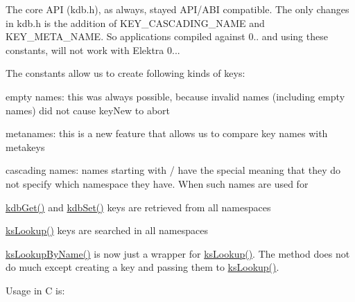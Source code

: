 The core A\+PI (kdb.\+h), as always, stayed A\+P\+I/\+A\+BI compatible. The only changes in kdb.\+h is the addition of {\ttfamily K\+E\+Y\+\_\+\+C\+A\+S\+C\+A\+D\+I\+N\+G\+\_\+\+N\+A\+ME} and {\ttfamily K\+E\+Y\+\_\+\+M\+E\+T\+A\+\_\+\+N\+A\+ME}. So applications compiled against 0.. and using these constants, will not work with Elektra 0...

The constants allow us to create following kinds of keys\+:


\begin{DoxyItemize}
\item empty names\+: this was always possible, because invalid names (including empty names) did not cause key\+New to abort
\item metanames\+: this is a new feature that allows us to compare key names with metakeys
\item cascading names\+: names starting with / have the special meaning that they do not specify which namespace they have. When such names are used for
\begin{DoxyItemize}
\item \mbox{\hyperlink{group__kdb_ga28e385fd9cb7ccfe0b2f1ed2f62453a1}{kdb\+Get()}} and \mbox{\hyperlink{group__kdb_ga11436b058408f83d303ca5e996832bcf}{kdb\+Set()}} keys are retrieved from all namespaces
\item \mbox{\hyperlink{group__keyset_gaa34fc43a081e6b01e4120daa6c112004}{ks\+Lookup()}} keys are searched in all namespaces
\item \mbox{\hyperlink{group__keyset_gad2e30fb6d4739d917c5abb2ac2f9c1a1}{ks\+Lookup\+By\+Name()}} is now just a wrapper for \mbox{\hyperlink{group__keyset_gaa34fc43a081e6b01e4120daa6c112004}{ks\+Lookup()}}. The method does not do much except creating a key and passing them to \mbox{\hyperlink{group__keyset_gaa34fc43a081e6b01e4120daa6c112004}{ks\+Lookup()}}.
\end{DoxyItemize}
\end{DoxyItemize}

Usage in C is\+:


\begin{DoxyCode}{0}
\end{DoxyCode}


